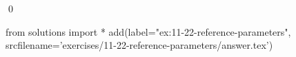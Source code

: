
\begin{ex}
  \label{ex:11-22-reference-parameters}
  
  \qed
\end{ex}
\begin{python0}
from solutions import *
add(label="ex:11-22-reference-parameters",
    srcfilename='exercises/11-22-reference-parameters/answer.tex')
\end{python0}
